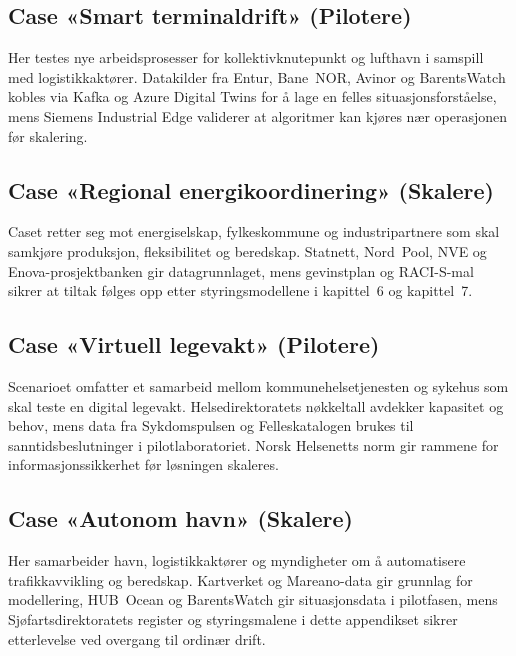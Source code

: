 \subsection{Case «Smart terminaldrift» (Pilotere)}
Her testes nye arbeidsprosesser for kollektivknutepunkt og lufthavn i samspill med logistikkaktører. Datakilder fra Entur, Bane~NOR, Avinor og BarentsWatch kobles via Kafka og Azure Digital Twins for å lage en felles situasjonsforståelse, mens Siemens Industrial Edge validerer at algoritmer kan kjøres nær operasjonen før skalering.

\subsection{Case «Regional energikoordinering» (Skalere)}
Caset retter seg mot energiselskap, fylkeskommune og industripartnere som skal samkjøre produksjon, fleksibilitet og beredskap. Statnett, Nord~Pool, NVE og Enova-prosjektbanken gir datagrunnlaget, mens gevinstplan og RACI-S-mal sikrer at tiltak følges opp etter styringsmodellene i kapittel~6 og kapittel~7.

\subsection{Case «Virtuell legevakt» (Pilotere)}
Scenarioet omfatter et samarbeid mellom kommunehelsetjenesten og sykehus som skal teste en digital legevakt. Helsedirektoratets nøkkeltall avdekker kapasitet og behov, mens data fra Sykdomspulsen og Felleskatalogen brukes til sanntidsbeslutninger i pilotlaboratoriet. Norsk Helsenetts norm gir rammene for informasjonssikkerhet før løsningen skaleres.

\subsection{Case «Autonom havn» (Skalere)}
Her samarbeider havn, logistikkaktører og myndigheter om å automatisere trafikkavvikling og beredskap. Kartverket og Mareano-data gir grunnlag for modellering, HUB~Ocean og BarentsWatch gir situasjonsdata i pilotfasen, mens Sjøfartsdirektoratets register og styringsmalene i dette appendikset sikrer etterlevelse ved overgang til ordinær drift.

